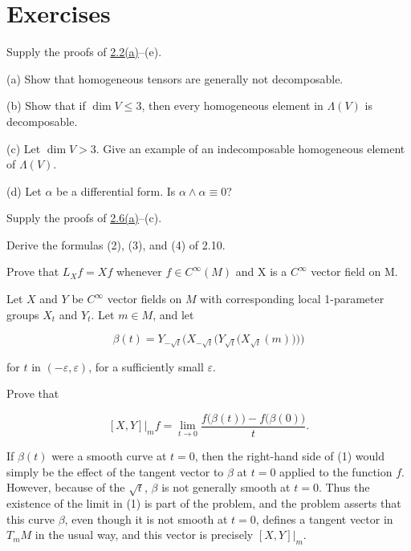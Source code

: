 \section{Exercises}

\begin{problemset}

\item Supply the proofs of \hyperref[thm:2.2]{2.2(a)}–(e).

\item (a) Show that homogeneous tensors are generally not decomposable.

(b) Show that if $\dim V \leq 3$, then every homogeneous element in $\Lambda(V)$ is decomposable.

(c) Let $\dim V > 3$. Give an example of an indecomposable homogeneous element of $\Lambda(V)$.

(d) Let  $ \alpha $ be a differential form. Is  $ \alpha \wedge \alpha \equiv 0 $?

\item Supply the proofs of \hyperref[thm:2.6]{2.6(a)}–(c).

\item Derive the formulas (2), (3), and (4) of 2.10.

\item Prove that  $ L_{X}f = Xf $ whenever  $ f \in C^{\infty}(M) $ and X is a  $ C^{\infty} $ vector field on M.

\item Let $X$ and $Y$ be $C^\infty$ vector fields on $M$ with corresponding local 1-parameter groups $X_t$ and $Y_t$. Let $m \in M$, and let

\[
\beta(t)=Y_{-\sqrt{t}}\big(X_{-\sqrt{t}}\big(Y_{\sqrt{t}}\big(X_{\sqrt{t}}(m)\big)\big)\big)
\]

for $t$ in $(-\varepsilon,\varepsilon)$, for a sufficiently small $\varepsilon$.

Prove that

\begin{center}
\end{center}

\begin{equation}
\left[X,Y\right]\big|_{m}f=\lim_{t\rightarrow0}\frac{f\big(\beta(t)\big)-f\big(\beta(0)\big)}{t}.
\end{equation}

If $\beta(t)$ were a smooth curve at $t=0$, then the right-hand side of (1) would simply be the effect of the tangent vector to $\beta$ at $t=0$ applied to the function $f$. However, because of the $\sqrt{t}$, $\beta$ is not generally smooth at $t=0$. Thus the existence of the limit in (1) is part of the problem, and the problem asserts that this curve $\beta$, even though it is not smooth at $t=0$, defines a tangent vector in $T_{m} M$ in the usual way, and this vector is precisely $[X,Y]|_{m}$.


\end{problemset}
